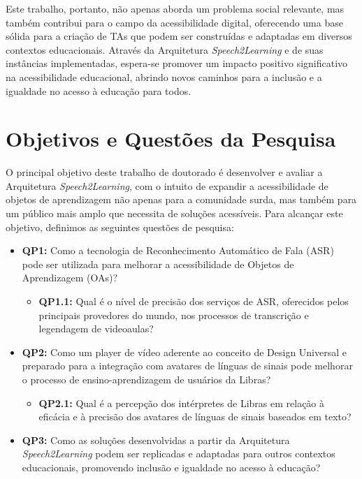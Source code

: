 Este trabalho, portanto, não apenas aborda um problema social relevante, mas também contribui para o campo da acessibilidade digital, oferecendo uma base sólida para a criação de TAs que podem ser construídas e adaptadas em diversos contextos educacionais. Através da Arquitetura \textit{Speech2Learning} e de suas instâncias implementadas, espera-se promover um impacto positivo significativo na acessibilidade educacional, abrindo novos caminhos para a inclusão e a igualdade no acesso à educação para todos.

\section{Objetivos e Questões da Pesquisa}

O principal objetivo deste trabalho de doutorado é desenvolver e avaliar a Arquitetura \textit{Speech2Learning}, com o intuito de expandir a acessibilidade de objetos de aprendizagem não apenas para a comunidade surda, mas também para um público mais amplo que necessita de soluções acessíveis. Para alcançar este objetivo, definimos as seguintes questões de pesquisa:

\begin{itemize}
\item \textbf{QP1:} Como a tecnologia de Reconhecimento Automático de Fala (ASR) pode ser utilizada para melhorar a acessibilidade de Objetos de Aprendizagem (OAs)?
\begin{itemize}
\item \textbf{QP1.1:} Qual é o nível de precisão dos serviços de ASR, oferecidos pelos principais provedores do mundo, nos processos de transcrição e legendagem de videoaulas?
\end{itemize}
\item \textbf{QP2:} Como um player de vídeo aderente ao conceito de Design Universal e preparado para a integração com avatares de línguas de sinais pode melhorar o processo de ensino-aprendizagem de usuários da Libras?
\begin{itemize}
\item \textbf{QP2.1:} Qual é a percepção dos intérpretes de Libras em relação à eficácia e à precisão dos avatares de línguas de sinais baseados em texto?
\end{itemize}
\item \textbf{QP3:} Como as soluções desenvolvidas a partir da Arquitetura \textit{Speech2Learning} podem ser replicadas e adaptadas para outros contextos educacionais, promovendo inclusão e igualdade no acesso à educação?
\end{itemize}

